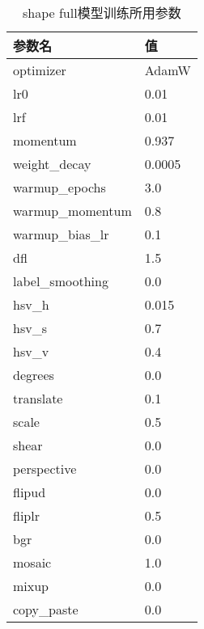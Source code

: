   
  \begin{table}
    \centering
  \begin{tabular}{ll}\toprule
     参数名&值\\\midrule
     optimizer&AdamW\\
     lr0& 0.01\\
     lrf& 0.01\\
     momentum& 0.937\\
     weight\_decay& 0.0005\\
     warmup\_epochs& 3.0\\
     warmup\_momentum& 0.8\\
     warmup\_bias\_lr& 0.1\\
     dfl& 1.5\\
     label\_smoothing& 0.0\\
   
     hsv\_h& 0.015\\
     hsv\_s& 0.7\\
     hsv\_v& 0.4\\
     degrees& 0.0\\
     translate& 0.1\\
     scale& 0.5\\
     shear& 0.0\\
     perspective& 0.0\\
     flipud& 0.0\\
     fliplr& 0.5\\
     bgr& 0.0\\
     mosaic& 1.0\\
     mixup& 0.0\\
     copy\_paste& 0.0\\
     \bottomrule
    \end{tabular}
    \caption{shape full模型训练所用参数}
    \end{table}
  
